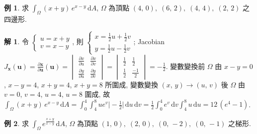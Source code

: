 \documentclass[12pt]{extarticle}
\newcommand{\ds}{\displaystyle}
\theoremstyle{definition}
\newtheorem*{ex}{例}
\newtheorem*{sol}{解}
\newcommand{\vu}{\mathbf{u}}
\newcommand{\vx}{\mathbf{x}}
\begin{document}
\begin{ex}
  求 $\ds\int_\Omega\!(x + y)\,e^{x - y}\,\text{d}A$, $\Omega$ 為頂點 $(4,\,0),\;(6,\,2),\;(4,\,4),\;(2,\,2)$ 之四邊形. 
\end{ex}

\begin{sol}
  令 $\ds\begin{cases}u = x + y \\ v = x - y\end{cases}\!\!\!\!\!$, 則 $\ds\begin{cases}x = \frac{1}{2}u + \frac{1}{2}v \\ y = \frac{1}{2}u - \frac{1}{2}v\end{cases}\!\!\!\!\!$; Jacobian $\ds J_{\vx}(\vu) = \frac{\partial\vx}{\partial\vu}(\vu) = \begin{vmatrix}\frac{\partial x}{\partial u} & \frac{\partial x}{\partial v} \\ \frac{\partial y}{\partial u}& \frac{\partial y}{\partial v}\end{vmatrix} = \begin{vmatrix}\frac{1}{2} & \frac{1}{2} \\ \frac{1}{2} & \frac{-1}{2}\end{vmatrix} = -\frac{1}{2}$. 變數變換前 $\Omega$ 由 $x - y = 0$, $x - y = 4$, $x + y = 4$, $x + y = 8$ 所圍成, 變數變換 $(x,\,y)\to(u,\,v)$ 後 $\Omega$ 由 $v = 0$, $v = 4$, $u = 4$, $u = 8$ 圍成, 故 $\ds\int_\Omega\!(x + y)\,e^{x - y}\,\text{d}A = \int_0^4\!\int_4^8 ue^v\Big|-\frac{1}{2}\Big|\,\text{d}u\,\text{d}v = \frac{1}{2}\int_0^4 e^v\,\text{d}v\!\int_4^8 u\,\text{d}u = 12\,(e^4 - 1)$.
\end{sol}

\begin{ex}
  求 $\ds\int_\Omega\!e^{\frac{x + y}{x - y}}\,\text{d}A$, $\Omega$ 為頂點 $(1,\,0),\;(2,\,0),\;(0,\,-2),\;(0,\,-1)$ 之梯形. 
\end{ex}
\end{document}
